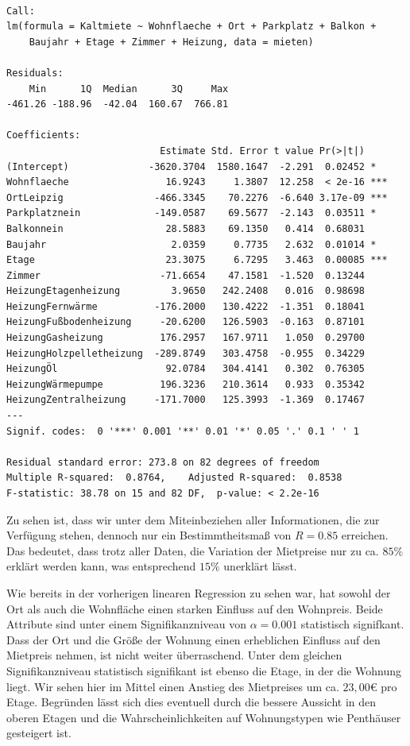 \documentclass[
  a4paper,
  DIV=11]{scrartcl}
\begin{document}
\begin{verbatim}

Call:
lm(formula = Kaltmiete ~ Wohnflaeche + Ort + Parkplatz + Balkon + 
    Baujahr + Etage + Zimmer + Heizung, data = mieten)

Residuals:
    Min      1Q  Median      3Q     Max 
-461.26 -188.96  -42.04  160.67  766.81 

Coefficients:
                           Estimate Std. Error t value Pr(>|t|)    
(Intercept)              -3620.3704  1580.1647  -2.291  0.02452 *  
Wohnflaeche                 16.9243     1.3807  12.258  < 2e-16 ***
OrtLeipzig                -466.3345    70.2276  -6.640 3.17e-09 ***
Parkplatznein             -149.0587    69.5677  -2.143  0.03511 *  
Balkonnein                  28.5883    69.1350   0.414  0.68031    
Baujahr                      2.0359     0.7735   2.632  0.01014 *  
Etage                       23.3075     6.7295   3.463  0.00085 ***
Zimmer                     -71.6654    47.1581  -1.520  0.13244    
HeizungEtagenheizung         3.9650   242.2408   0.016  0.98698    
HeizungFernwärme          -176.2000   130.4222  -1.351  0.18041    
HeizungFußbodenheizung     -20.6200   126.5903  -0.163  0.87101    
HeizungGasheizung          176.2957   167.9711   1.050  0.29700    
HeizungHolzpelletheizung  -289.8749   303.4758  -0.955  0.34229    
HeizungÖl                   92.0784   304.4141   0.302  0.76305    
HeizungWärmepumpe          196.3236   210.3614   0.933  0.35342    
HeizungZentralheizung     -171.7000   125.3993  -1.369  0.17467    
---
Signif. codes:  0 '***' 0.001 '**' 0.01 '*' 0.05 '.' 0.1 ' ' 1

Residual standard error: 273.8 on 82 degrees of freedom
Multiple R-squared:  0.8764,    Adjusted R-squared:  0.8538 
F-statistic: 38.78 on 15 and 82 DF,  p-value: < 2.2e-16
\end{verbatim}

Zu sehen ist, dass wir unter dem Miteinbeziehen aller Informationen, die
zur Verfügung stehen, dennoch nur ein Bestimmtheitsmaß von \(R = 0.85\)
erreichen. Das bedeutet, dass trotz aller Daten, die Variation der
Mietpreise nur zu ca. \(85\%\) erklärt werden kann, was entsprechend
\(15\%\) unerklärt lässt.

Wie bereits in der vorherigen linearen Regression zu sehen war, hat
sowohl der Ort als auch die Wohnfläche einen starken Einfluss auf den
Wohnpreis. Beide Attribute sind unter einem Signifikanzniveau von
\(\alpha = 0.001\) statistisch signifkant. Dass der Ort und die Größe
der Wohnung einen erheblichen Einfluss auf den Mietpreis nehmen, ist
nicht weiter überraschend. Unter dem gleichen Signifikanzniveau
statistisch signifikant ist ebenso die Etage, in der die Wohnung liegt.
Wir sehen hier im Mittel einen Anstieg des Mietpreises um ca. \(23,00€\)
pro Etage. Begründen lässt sich dies eventuell durch die bessere
Aussicht in den oberen Etagen und die Wahrscheinlichkeiten auf
Wohnungstypen wie Penthäuser gesteigert ist.
\end{document}
